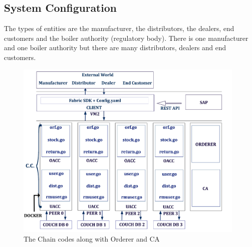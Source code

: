 \documentclass{article}
\begin{document}
\subsection{System Configuration}\label{configuration}
The types of entities are the manufacturer, the distributors, the dealers, end customers and the boiler authority (regulatory body). There is one manufacturer and one boiler authority but there are many distributors, dealers and end customers.  
\begin{figure}[ht]
\centering
\includegraphics[scale=0.07]{Architecture-Diagram.png}
\caption{The Chain codes along with Orderer and CA}
\end{figure}
\end{document}
